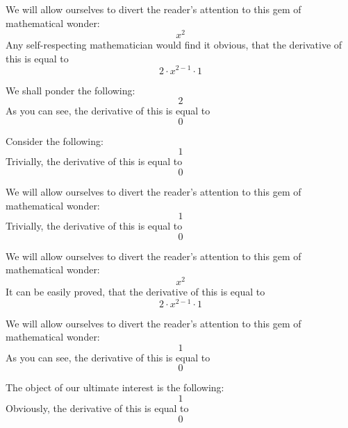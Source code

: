 \documentclass{article}
\begin{document}
We will allow ourselves to divert the reader's attention to this gem of mathematical wonder:
\begin{equation}
x ^{2 } 
\end{equation}
Any self-respecting mathematician would find it obvious, that the derivative of this is equal to
\begin{equation}
2 \cdot x ^{2 - 1 } \cdot 1 
\end{equation}

We shall ponder the following:
\begin{equation}
2 
\end{equation}
As you can see, the derivative of this is equal to
\begin{equation}
0 
\end{equation}

Consider the following:
\begin{equation}
1 
\end{equation}
Trivially, the derivative of this is equal to
\begin{equation}
0 
\end{equation}

We will allow ourselves to divert the reader's attention to this gem of mathematical wonder:
\begin{equation}
1 
\end{equation}
Trivially, the derivative of this is equal to
\begin{equation}
0 
\end{equation}

We will allow ourselves to divert the reader's attention to this gem of mathematical wonder:
\begin{equation}
x ^{2 } 
\end{equation}
It can be easily proved, that the derivative of this is equal to
\begin{equation}
2 \cdot x ^{2 - 1 } \cdot 1 
\end{equation}

We will allow ourselves to divert the reader's attention to this gem of mathematical wonder:
\begin{equation}
1 
\end{equation}
As you can see, the derivative of this is equal to
\begin{equation}
0 
\end{equation}

The object of our ultimate interest is the following:
\begin{equation}
1 
\end{equation}
Obviously, the derivative of this is equal to
\begin{equation}
0 
\end{equation}
\end{document}
